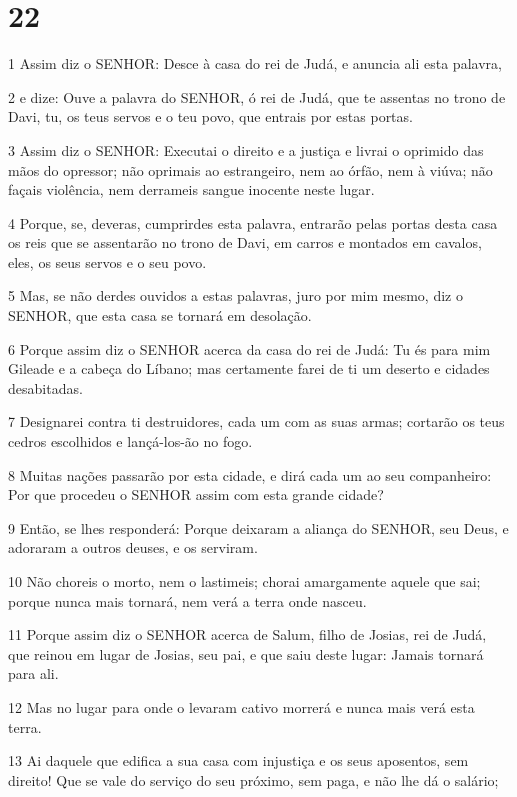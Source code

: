 \chapter{22}

\par 1 Assim diz o SENHOR: Desce à casa do rei de Judá, e anuncia ali esta palavra,
\par 2 e dize: Ouve a palavra do SENHOR, ó rei de Judá, que te assentas no trono de Davi, tu, os teus servos e o teu povo, que entrais por estas portas.
\par 3 Assim diz o SENHOR: Executai o direito e a justiça e livrai o oprimido das mãos do opressor; não oprimais ao estrangeiro, nem ao órfão, nem à viúva; não façais violência, nem derrameis sangue inocente neste lugar.
\par 4 Porque, se, deveras, cumprirdes esta palavra, entrarão pelas portas desta casa os reis que se assentarão no trono de Davi, em carros e montados em cavalos, eles, os seus servos e o seu povo.
\par 5 Mas, se não derdes ouvidos a estas palavras, juro por mim mesmo, diz o SENHOR, que esta casa se tornará em desolação.
\par 6 Porque assim diz o SENHOR acerca da casa do rei de Judá: Tu és para mim Gileade e a cabeça do Líbano; mas certamente farei de ti um deserto e cidades desabitadas.
\par 7 Designarei contra ti destruidores, cada um com as suas armas; cortarão os teus cedros escolhidos e lançá-los-ão no fogo.
\par 8 Muitas nações passarão por esta cidade, e dirá cada um ao seu companheiro: Por que procedeu o SENHOR assim com esta grande cidade?
\par 9 Então, se lhes responderá: Porque deixaram a aliança do SENHOR, seu Deus, e adoraram a outros deuses, e os serviram.
\par 10 Não choreis o morto, nem o lastimeis; chorai amargamente aquele que sai; porque nunca mais tornará, nem verá a terra onde nasceu.
\par 11 Porque assim diz o SENHOR acerca de Salum, filho de Josias, rei de Judá, que reinou em lugar de Josias, seu pai, e que saiu deste lugar: Jamais tornará para ali.
\par 12 Mas no lugar para onde o levaram cativo morrerá e nunca mais verá esta terra.
\par 13 Ai daquele que edifica a sua casa com injustiça e os seus aposentos, sem direito! Que se vale do serviço do seu próximo, sem paga, e não lhe dá o salário;
